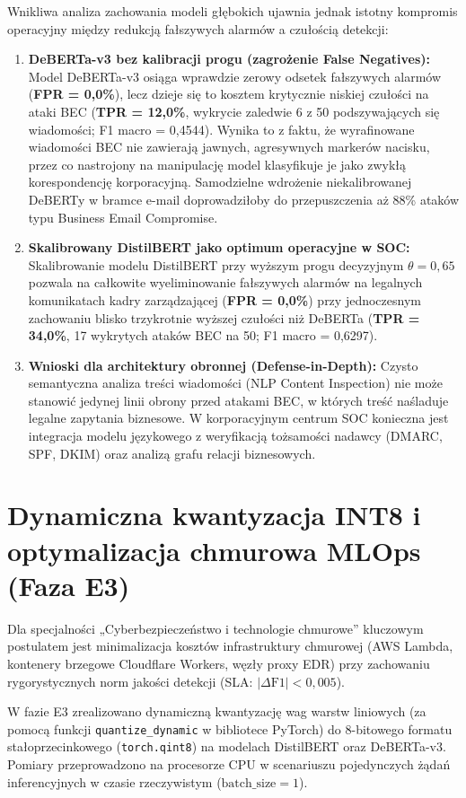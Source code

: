 \documentclass[12pt,a4paper,twoside]{report}
\begin{document}
Wnikliwa analiza zachowania modeli głębokich ujawnia jednak istotny kompromis operacyjny między redukcją fałszywych alarmów a czułością detekcji:
\begin{enumerate}[leftmargin=*]
  \item \textbf{DeBERTa-v3 bez kalibracji progu (zagrożenie False Negatives):} Model DeBERTa-v3 osiąga wprawdzie zerowy odsetek fałszywych alarmów (\textbf{FPR = 0,0\%}), lecz dzieje się to kosztem krytycznie niskiej czułości na ataki BEC (\textbf{TPR = 12,0\%}, wykrycie zaledwie 6 z 50 podszywających się wiadomości; F1 macro = 0,4544). Wynika to z faktu, że wyrafinowane wiadomości BEC nie zawierają jawnych, agresywnych markerów nacisku, przez co nastrojony na manipulację model klasyfikuje je jako zwykłą korespondencję korporacyjną. Samodzielne wdrożenie niekalibrowanej DeBERTy w bramce e-mail doprowadziłoby do przepuszczenia aż 88\% ataków typu Business Email Compromise.
  \item \textbf{Skalibrowany DistilBERT jako optimum operacyjne w SOC:} Skalibrowanie modelu DistilBERT przy wyższym progu decyzyjnym $\theta = 0,65$ pozwala na całkowite wyeliminowanie fałszywych alarmów na legalnych komunikatach kadry zarządzającej (\textbf{FPR = 0,0\%}) przy jednoczesnym zachowaniu blisko trzykrotnie wyższej czułości niż DeBERTa (\textbf{TPR = 34,0\%}, 17 wykrytych ataków BEC na 50; F1 macro = 0,6297).
  \item \textbf{Wnioski dla architektury obronnej (Defense-in-Depth):} Czysto semantyczna analiza treści wiadomości (NLP Content Inspection) nie może stanowić jedynej linii obrony przed atakami BEC, w których treść naśladuje legalne zapytania biznesowe. W korporacyjnym centrum SOC konieczna jest integracja modelu językowego z weryfikacją tożsamości nadawcy (DMARC, SPF, DKIM) oraz analizą grafu relacji biznesowych.
\end{enumerate}

\section{Dynamiczna kwantyzacja INT8 i optymalizacja chmurowa MLOps (Faza E3)}
Dla specjalności „Cyberbezpieczeństwo i technologie chmurowe” kluczowym postulatem jest minimalizacja kosztów infrastruktury chmurowej (AWS Lambda, kontenery brzegowe Cloudflare Workers, węzły proxy EDR) przy zachowaniu rygorystycznych norm jakości detekcji (SLA: $|\Delta\text{F1}| < 0,005$).

W fazie E3 zrealizowano dynamiczną kwantyzację wag warstw liniowych (za pomocą funkcji \texttt{quantize\_dynamic} w bibliotece PyTorch) do 8-bitowego formatu stałoprzecinkowego (\texttt{torch.qint8}) na modelach DistilBERT oraz DeBERTa-v3. Pomiary przeprowadzono na procesorze CPU w scenariuszu pojedynczych żądań inferencyjnych w czasie rzeczywistym ($\text{batch\_size} = 1$).
\end{document}
